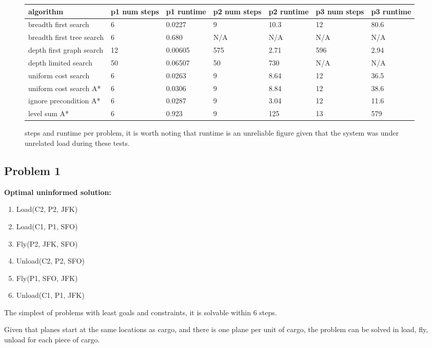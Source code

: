 \documentclass[11pt]{article}
\begin{document}
\begin{figure}[H]
	\begin{tabular}{|p{2cm}|| p{1.3cm} p{1.3cm} | p{1.3cm} p{1.3cm} | p{1.3cm} p{1.3cm} |} 
		\hline
		algorithm & p1 num steps & p1 runtime & p2 num steps & p2 runtime & p3 num steps & p3 runtime \\
		\hline
		\hline
		breadth first search & 6 & 0.0227 & 9 & 10.3 & 12 & 80.6  \\
		\hline
		breadth first tree search & 6 & 0.680 & N/A & N/A & N/A & N/A  \\
		\hline
		depth first graph search & 12 & 0.00605 & 575 & 2.71 & 596 & 2.94  \\
		\hline
		depth limited search & 50 & 0.06507 & 50 & 730 & N/A & N/A  \\
		\hline
		uniform cost search & 6 & 0.0263 & 9 & 8.64 & 12 & 36.5  \\
		\hline
		uniform cost search A* & 6 & 0.0306 & 9 & 8.84 & 12 & 38.6 \\
		\hline
		ignore precondition A* & 6 & 0.0287 & 9 & 3.04 & 12 & 11.6\\
		\hline
		level sum A* & 6 & 0.923 & 9 & 125 & 13 & 579 \\
		\hline
	\end{tabular}
	\caption{steps and runtime per problem, it is worth noting that runtime is an unreliable figure given that the system was under unrelated load during these tests.}
	\label{results_timestep}
\end{figure}

\subsection{Problem 1}

\textbf{Optimal uninformed solution:}
\begin{enumerate}
	\item Load(C2, P2, JFK)
	\item Load(C1, P1, SFO)
	\item Fly(P2, JFK, SFO)
	\item Unload(C2, P2, SFO)
	\item Fly(P1, SFO, JFK)
	\item Unload(C1, P1, JFK)
\end{enumerate}

The simplest of problems with least goals and constraints, it is solvable within 6 steps.

Given that planes start at the same locations as cargo, and there is one plane per unit of cargo, the problem can be solved in load, fly, unload for each piece of cargo.
\end{document}
